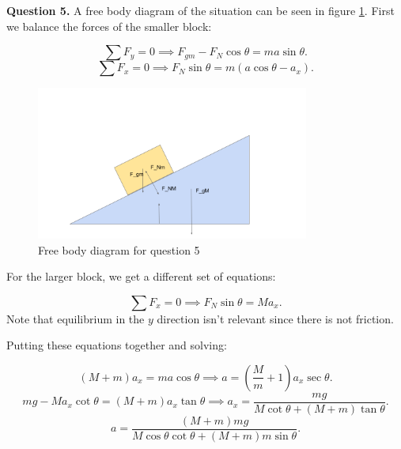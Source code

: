 \documentclass[letterpaper, reqno,11pt]{article}
\begin{document}
{\noindent\bf Question 5.} A free body diagram of the situation can be seen in figure \ref{fig:q5}. First we balance the forces of the smaller block: 

\[
\sum F_y=0\implies F_{gm}-F_{N}\cos\theta=m a\sin\theta
.\]
\[
\sum F_x=0\implies F_{N}\sin\theta=m(a\cos\theta-a_x)
.\]

\begin{figure}[htpb]
    \centering
    \includegraphics[width=0.8\textwidth]{q5}
    \caption{Free body diagram for question 5}
    \label{fig:q5}
\end{figure}

For the larger block, we get a different set of equations: 

\[
\sum F_x=0\implies F_N\sin\theta=Ma_x
.\]
Note that equilibrium in the $y$ direction isn't relevant since there is not friction. 

Putting these equations together and solving: 

\[
    (M+m)a_x=ma\cos\theta\implies a=(\frac{M}{m}+1)a_x \sec\theta
.\]
\[
    mg-Ma_x\cot\theta=(M+m)a_x\tan\theta\implies a_x=\frac{mg}{M\cot\theta+(M+m)\tan\theta}
.\]
\[
a=\frac{(M+m)mg}{M\cos\theta\cot\theta+(M+m)m\sin\theta}
.\]
\end{document}

